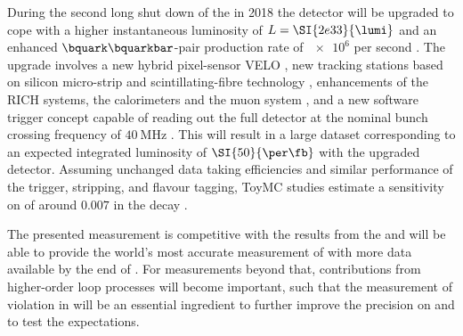 During the second long shut down of the \LHC in 2018 the \LHCb detector will be
upgraded to cope with a higher instantaneous luminosity of $L =
\SI{2e33}{\lumi}$ and an enhanced $\bquark\bquarkbar$-pair production rate of
$\num{e6}$ per second \cite{Bediaga:1443882}. The upgrade involves a new hybrid
pixel-sensor \acl{VELO} \cite{TDRVELO}, new tracking stations based on silicon
micro-strip and scintillating-fibre technology \cite{TDRTracking}, enhancements
of the \acl{RICH} systems, the calorimeters and the muon system \cite{TDRPID},
and a new software trigger concept capable of reading out the full detector at
the nominal bunch crossing frequency of $\SI{40}{\mega\hertz}$
\cite{TDRTrigger}. This will result in a large dataset corresponding to an
expected integrated luminosity of $\SI{50}{\per\fb}$ with the upgraded detector.
Assuming unchanged data taking efficiencies and similar performance of the
trigger, stripping, and flavour tagging, \acl{ToyMC} studies estimate a
sensitivity on \sintwobeta of around $\num{0.007}$ \cite{Moedden:2015} in the
decay \BdToJpsiKS.

The presented measurement is competitive with the results from the \BFactories and
\LHCb will be able to provide the world's most accurate measurement of
\sintwobeta with more data available by the end of \RunTwo. For measurements
beyond that, contributions from higher-order loop processes will become
important, such that the measurement of \CP violation in \BsToJpsiKS will be an
essential ingredient to further improve the precision on \sintwobeta and to test
the \SM expectations.


